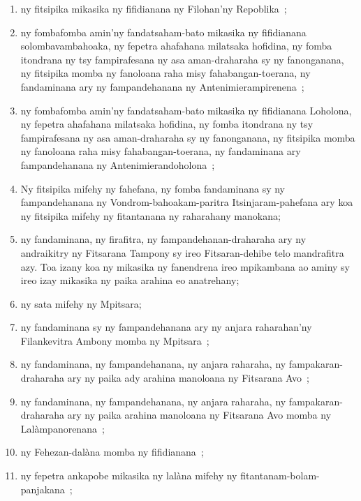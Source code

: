 \documentclass[12pt]{article}
\begin{document}
\begin{enumerate}
\item ny fitsipika mikasika ny fifidianana ny Filohan'ny Repoblika~;

\item ny fombafomba amin'ny fandatsaham-bato mikasika ny fifidianana
  solombavambahoaka, ny fepetra ahafahana milatsaka hofidina, ny fomba itondrana
  ny tsy fampirafesana ny asa aman-draharaha sy ny fanonganana, ny fitsipika
  momba ny fanoloana raha misy fahabangan-toerana, ny fandaminana ary ny
  fampandehanana ny Antenimierampirenena~;

\item ny fombafomba amin'ny fandatsaham-bato mikasika ny fifidianana Loholona,
  ny fepetra ahafahana milatsaka hofidina, ny fomba itondrana ny tsy
  fampirafesana ny asa aman-draharaha sy ny fanonganana, ny fitsipika momba ny
  fanoloana raha misy fahabangan-toerana, ny fandaminana ary fampandehanana ny
  Antenimierandoholona~;

\item Ny fitsipika mifehy ny fahefana, ny fomba fandaminana sy ny fampandehanana
  ny Vondrom-bahoakam-paritra Itsinjaram-pahefana ary koa ny fitsipika mifehy ny
  fitantanana ny raharahany manokana;

\item ny fandaminana, ny firafitra, ny fampandehanan-draharaha ary ny
  andraikitry ny Fitsarana Tampony sy ireo Fitsaran-dehibe telo mandrafitra
  azy. Toa izany koa ny mikasika ny fanendrena ireo mpikambana ao aminy sy ireo
  izay mikasika ny paika arahina eo anatrehany;

\item ny sata mifehy ny Mpitsara;

\item ny fandaminana sy ny fampandehanana ary ny anjara raharahan'ny
  Filankevitra Ambony momba ny Mpitsara~;

\item ny fandaminana, ny fampandehanana, ny anjara raharaha, ny
  fampakaran-draharaha ary ny paika ady arahina manoloana ny Fitsarana Avo~;

\item ny fandaminana, ny fampandehanana, ny anjara raharaha, ny
  fampakaran-draharaha ary ny paika arahina manoloana ny Fitsarana Avo momba ny
  Lalàmpanorenana~;

\item ny Fehezan-dalàna momba ny fifidianana~;

\item ny fepetra ankapobe mikasika ny lalàna mifehy ny
  fitantanam-bolam-panjakana~;


\end{enumerate}
\end{document}
